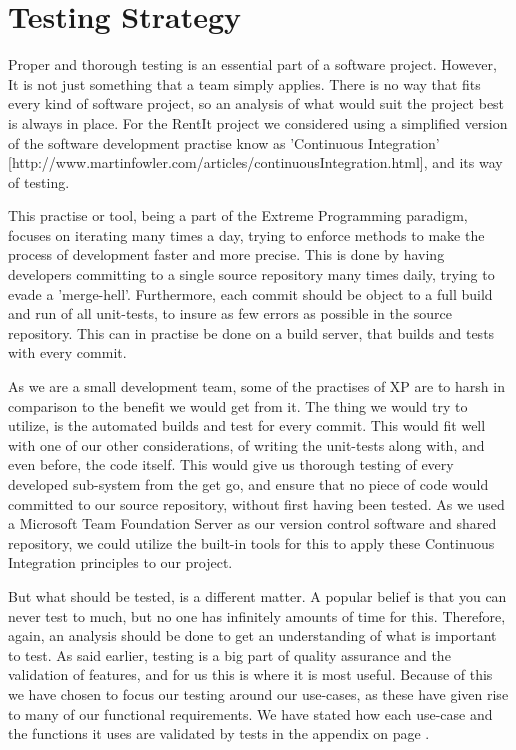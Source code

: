 \section{Testing Strategy} \label{TestingStrategy}
Proper and thorough testing is an essential part of a software project. However, It is not just something that a team simply applies. There is no way that fits every kind of software project, so an analysis of what would suit the project best is always in place. For the RentIt project we considered using a simplified version of the software development practise know as 'Continuous Integration' [http://www.martinfowler.com/articles/continuousIntegration.html], and its way of testing.

This practise or tool, being a part of the Extreme Programming paradigm, focuses on iterating many times a day, trying to enforce methods to make the process of development faster and more precise. This is done by having developers committing to a single source repository many times daily, trying to evade a 'merge-hell'. Furthermore, each commit should be object to a full build and run of all unit-tests, to insure as few errors as possible in the source repository. This can in practise be done on a build server, that builds and tests with every commit.

As we are a small development team, some of the practises of XP are to harsh in comparison to the benefit we would get from it. The thing we would try to utilize, is the automated builds and test for every commit. This would fit well with one of our other considerations, of writing the unit-tests along with, and even before, the code itself. This would give us thorough testing of every developed sub-system from the get go, and ensure that no piece of code would  committed to our source repository, without first having been tested. As we used a Microsoft Team Foundation Server as our version control software and shared repository, we could utilize the built-in tools for this to apply these Continuous Integration principles to our project.

But what should be tested, is a different matter. A popular belief is that you can never test to much, but no one has infinitely amounts of time for this. Therefore, again, an analysis should be done to get an understanding of what is important to test. As said earlier, testing is a big part of quality assurance and the validation of features, and for us this is where it is most useful. Because of this we have chosen to focus our testing around our use-cases, as these have given rise to many of our functional requirements. We have stated how each use-case and the functions it uses are validated by tests in the appendix on page \pageref{TestAppendix}.

